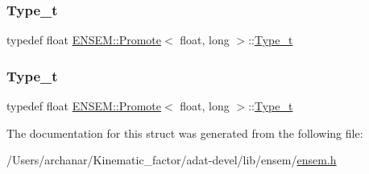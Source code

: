 \mbox{\label{structENSEM_1_1Promote_3_01float_00_01long_01_4_ab0b76c324678abb784e8e19c41e172c0}} 
\subsubsection{\texorpdfstring{Type\_t}{Type\_t}\hspace{0.1cm}{\footnotesize\ttfamily [2/3]}}
{\footnotesize\ttfamily typedef float \mbox{\hyperlink{structENSEM_1_1Promote}{E\+N\+S\+E\+M\+::\+Promote}}$<$ float, long $>$\+::\mbox{\hyperlink{structENSEM_1_1Promote_3_01float_00_01long_01_4_ab0b76c324678abb784e8e19c41e172c0}{Type\+\_\+t}}}

\mbox{\label{structENSEM_1_1Promote_3_01float_00_01long_01_4_ab0b76c324678abb784e8e19c41e172c0}} 
\subsubsection{\texorpdfstring{Type\_t}{Type\_t}\hspace{0.1cm}{\footnotesize\ttfamily [3/3]}}
{\footnotesize\ttfamily typedef float \mbox{\hyperlink{structENSEM_1_1Promote}{E\+N\+S\+E\+M\+::\+Promote}}$<$ float, long $>$\+::\mbox{\hyperlink{structENSEM_1_1Promote_3_01float_00_01long_01_4_ab0b76c324678abb784e8e19c41e172c0}{Type\+\_\+t}}}



The documentation for this struct was generated from the following file\+:\begin{DoxyCompactItemize}
\item 
/\+Users/archanar/\+Kinematic\+\_\+factor/adat-\/devel/lib/ensem/\mbox{\hyperlink{adat-devel_2lib_2ensem_2ensem_8h}{ensem.\+h}}\end{DoxyCompactItemize}
